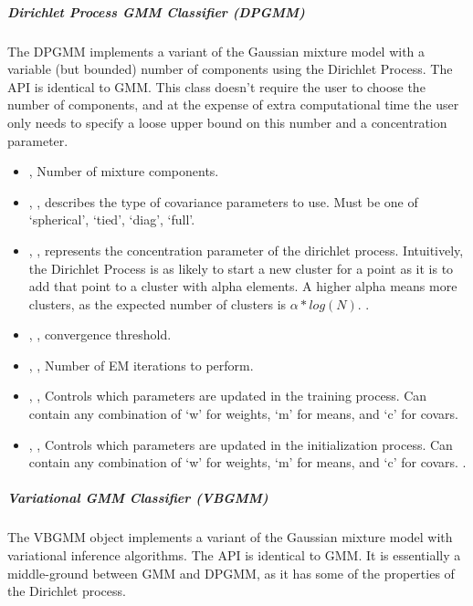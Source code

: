 \subparagraph{ Dirichlet Process GMM Classifier (DPGMM)} \hfill
\label{subparagraph:DPGMM}

The DPGMM implements a variant of the Gaussian mixture model with
 a variable (but bounded) number of components using the Dirichlet
 Process. The API is identical to GMM. This class doesn’t require
the user to choose the number of components, and at the expense of
 extra computational time the user only needs to specify a loose
 upper bound on this number and a concentration parameter.

\begin{itemize}
	\item {},  Number of mixture components. 
	\item {}, , describes the type of covariance parameters to use.
Must be one of ‘spherical’, ‘tied’, ‘diag’, ‘full’. 
	\item {}, ,
represents the concentration parameter of the dirichlet process.
Intuitively, the Dirichlet Process is as likely to start a new cluster
 for a point as it is to add that point to a cluster with alpha
 elements. A higher alpha means more clusters, as the expected
number of clusters is ${\alpha*log(N)}$. .
	\item {}, ,
convergence threshold. 
	\item {}, ,
Number of EM iterations to perform. 
	\item {}, ,
 Controls which parameters are updated in the training process.
Can contain any combination of ‘w’ for weights, ‘m’ for means, and
‘c’ for covars. 
	\item {}, , Controls which parameters are updated in the initialization
process. Can contain any combination of ‘w’ for weights, ‘m’ for means,
 and ‘c’ for covars. .
\end{itemize}

\subparagraph{ Variational GMM Classifier (VBGMM)} \hfill
\label{subparagraph:VBGMM}

The VBGMM object implements a variant of the Gaussian mixture model
 with variational inference algorithms. The API is identical to GMM.
 It is essentially a middle-ground between GMM and DPGMM, as it has
some of the properties of the Dirichlet process.

